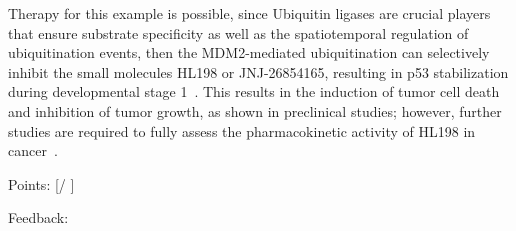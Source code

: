 \documentclass[plain,basic]{inVerba-notes}
\begin{document}
{\begin{enumerate}
{    Therapy for this example is possible, since Ubiquitin ligases are crucial players that ensure substrate specificity as well as the spatiotemporal regulation of ubiquitination events, then the MDM2-mediated ubiquitination can selectively inhibit the small molecules HL198 or JNJ-26854165, resulting in p53 stabilization during developmental stage 1~\cite{popovic2014ubiquitination}. This results in the induction of tumor cell death and inhibition of tumor growth, as shown in preclinical studies; however, further studies are required to fully assess the pharmacokinetic activity of HL198 in cancer~\cite{popovic2014ubiquitination}.

    }

    Points: [\qquad / \qquad ]

    Feedback: 

\end{enumerate}

}

\nocite*{}


\end{document}
